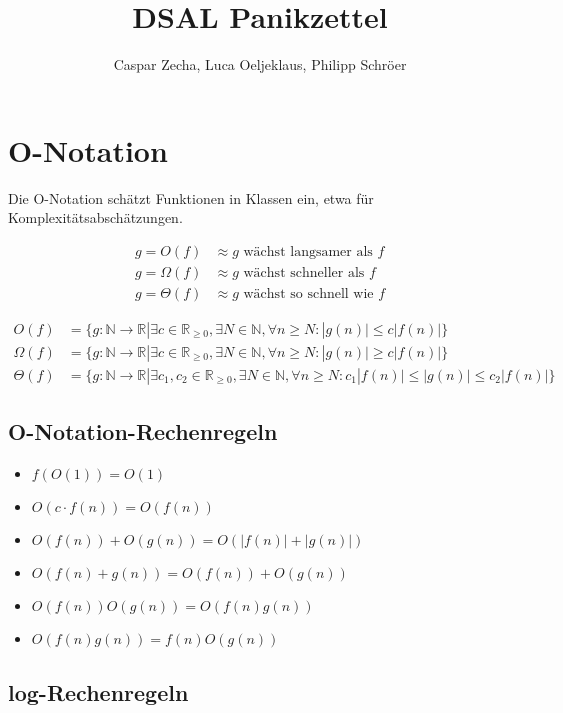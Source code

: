 \documentclass[11pt]{scrartcl}
\title{DSAL Panikzettel}
\author{Caspar Zecha, Luca Oeljeklaus, Philipp Schröer}
\begin{document}
\maketitle

\setcounter{tocdepth}{2}
\tableofcontents

\section{O-Notation}

Die O-Notation schätzt Funktionen in Klassen ein, etwa für Komplexitätsabschätzungen.

\begin{align*}
g = O(f) &\approx g \text{ wächst langsamer als } f\\
g = \Omega(f) &\approx g \text{ wächst schneller als } f \\
g = \Theta(f) &\approx g \text{ wächst so schnell wie } f
\end{align*}

\begin{align*}
O(f) &= \{g: \mathbb{N}\to \mathbb{R}|\exists c \in \mathbb{R}_{\ge 0},\exists N \in \mathbb{N}, \forall n \ge N:|g(n)| \leq c|f(n)|\} \\
\Omega(f) &= \{g: \mathbb{N}\to \mathbb{R}|\exists c \in \mathbb{R}_{\ge 0},\exists N \in \mathbb{N}, \forall n \ge N:|g(n)| \ge c|f(n)|\} \\
\Theta(f) &= \{g: \mathbb{N}\to \mathbb{R}|\exists c_1,c_2 \in \mathbb{R}_{\ge 0},\exists N \in \mathbb{N}, \forall n \ge N:c_1|f(n)| \leq |g(n)| \leq c_2|f(n)|\}
\end{align*}

\subsection{O-Notation-Rechenregeln}
\begin{itemize}
	\item $f(O(1)) = O(1)$
	\item $O(c \cdot f(n))=O(f(n))$
    \item $O(f(n)) + O(g(n)) = O(|f(n)| + |g(n)|)$
    \item $O(f(n) + g(n)) = O(f(n)) + O(g(n))$
    \item $O(f(n))O(g(n)) = O(f(n)g(n))$
    \item $O(f(n)g(n)) = f(n)O(g(n))$
\end{itemize}

\subsection{log-Rechenregeln}
\end{document}
